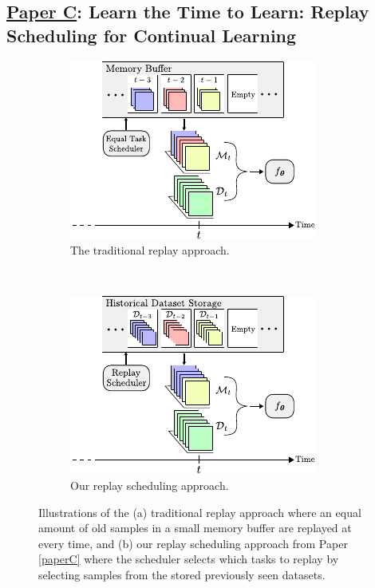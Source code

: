 \subsection{\underline{Paper C}: Learn the Time to Learn: Replay Scheduling for Continual Learning}

\begin{figure}[t]
	\centering 
    \begin{subfigure}[b]{0.48\textwidth}
		\centering
		\includegraphics[width=\textwidth]{Chapter1/figures/replay_approach_new.pdf}
		\caption{The traditional replay approach.}
		\label{fig:paperC_standard_replay}
	\end{subfigure}~
    \begin{subfigure}[b]{0.48\textwidth}
		\centering
		\includegraphics[width=\textwidth]{Chapter1/figures/replay_scheduling_new.pdf}
		\caption{Our replay scheduling approach.}
		\label{fig:paperC_our_approach}
	\end{subfigure}
	\caption{Illustrations of the (a) traditional replay approach where an equal amount of old samples in a small memory buffer are replayed at every time, and (b) our replay scheduling approach from Paper \ref{paperC} where the scheduler selects which tasks to replay by selecting samples from the stored previously seen datasets.}
	\vspace{-2mm}
	\label{fig:paperC}
\end{figure}

